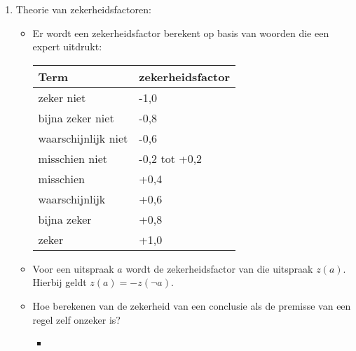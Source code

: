 \begin{itemize}
\begin{itemize}
\begin{enumerate}
\begin{itemize}
				Als $a = $ het regent morgen en $b = $ het regent niet morgen, dan is $p(a\; \hbox{\textbf{en}}\;b) = 0$. 
				
				Als $a = $ het regent morgen en $b = $ het regent morgenochtend, dan is $p(a\; \hbox{\textbf{en}}\;b) = 0,2$
				
				\alert Bayesiaans redeneren is geen aangewezen methode.
			\end{itemize}
			\item Theorie van zekerheidsfactoren:
			\begin{itemize}
				\item Er wordt een zekerheidsfactor berekent op basis van woorden die een expert uitdrukt:
				\begin{table}[h]
					\centering
					\begin{tabular}{| l | l |}
						\hline 
						Term & zekerheidsfactor \\
						\hline 
						zeker niet & -1,0 \\
						bijna zeker niet & -0,8 \\
						waarschijnlijk niet & -0,6 \\
						misschien niet & -0,2 tot +0,2 \\
						misschien & +0,4 \\
						waarschijnlijk & +0,6 \\
						bijna zeker & +0,8 \\
						zeker & +1,0 \\
						\hline
					\end{tabular}
				\end{table}
			
				\item Voor een uitspraak $a$ wordt de zekerheidsfactor van die uitspraak $z(a)$. Hierbij geldt $z(a) = -z(\neg a)$.
				
				\item Hoe berekenen van de zekerheid van een conclusie als de premisse van een regel zelf onzeker is?
				
				\begin{itemize}
					
					\item[] \noindent{}
		

\end{itemize}
\end{itemize}
\end{enumerate}
\end{itemize}
\end{itemize}
